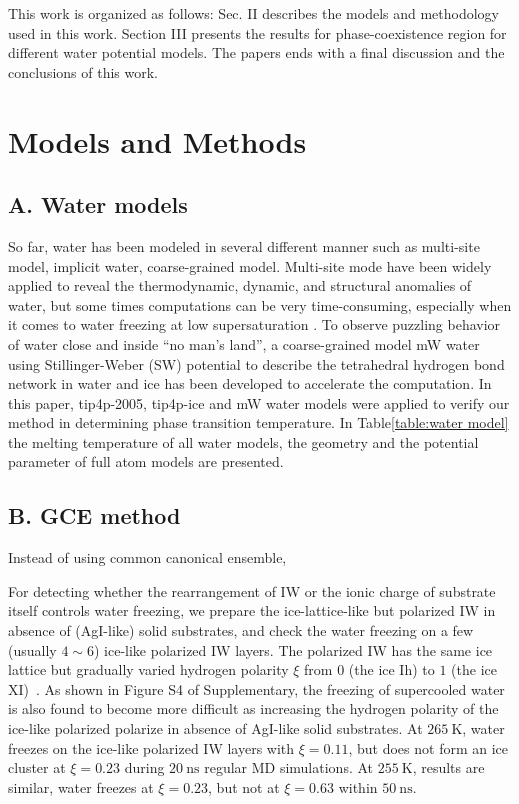\documentclass[aps,prl,twocolumn,superscriptaddress]{revtex4-1}
\begin{document}
This work is organized as follows: Sec. II describes the models and methodology used in this work. Section III presents the results for phase-coexistence region for different water potential models. The papers ends with a final discussion and the conclusions of this work.
\section{Models and Methods} 
\subsection{A. Water models}
So far, water has been modeled in several different manner such as multi-site model\cite{Sanz2004,Bryk2002,Horn2005,Gonzalez2010,Kumar2012,Sedlmeier2011,Vega2007,Yu2013,Himoto2011}, implicit water\cite{Huißmann2012}, coarse-grained model\cite{Molinero2009}. Multi-site mode have been widely applied to reveal the thermodynamic, dynamic, and structural anomalies of water\cite{Gao2000,Bryk2002,Sanz2004}, but some times computations can be very time-consuming, especially when it comes to water freezing at low supersaturation\cite{Mishima1998} . To observe puzzling behavior of water close and inside “no man’s land”\cite{Moore2011}, a coarse-grained model mW water\cite{Molinero2009} using Stillinger-Weber (SW) potential to describe the tetrahedral hydrogen bond network in water and ice has been developed to accelerate the computation. In this paper, tip4p-2005, tip4p-ice and mW water models were applied to verify our method in determining phase transition temperature. In Table\ref{table:water model}  the melting temperature of all water models, the geometry and the potential parameter of full atom models are presented. 

\subsection{B. GCE method}

Instead of using common canonical ensemble,

For detecting whether the rearrangement of IW or the ionic charge of substrate itself controls  water freezing, we prepare the ice-lattice-like but polarized IW in absence of (AgI-like) solid substrates, and check the water freezing on a few (usually $4\sim 6$) ice-like polarized IW layers. The polarized IW has the same ice lattice but gradually varied hydrogen polarity $\xi$ from $0$ (the ice Ih) to $1$ (the ice XI)~\cite{Salzmann2006,Salzmann2009,Raza2011,Fan2010,Geiger2014}. As shown in Figure S4 of Supplementary, the freezing of supercooled water is also found to become more difficult as increasing the hydrogen polarity of the ice-like polarized polarize in absence of AgI-like solid substrates.  
At $265~\mathrm{K}$, water freezes on the ice-like polarized IW layers with $\xi =0.11$, but does not form an ice cluster at $\xi=0.23$ during $20~\mathrm{ns}$ regular MD simulations. At $255~\mathrm{K}$, results are similar, water freezes at $\xi=0.23$, but not at $\xi=0.63$ within  $50~\mathrm{ns}$. 
    
\end{document}
